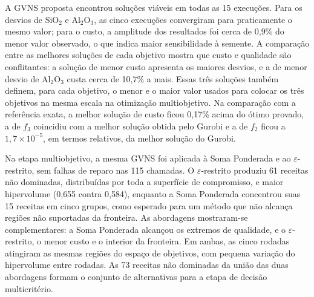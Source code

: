 \documentclass[conference]{IEEEtran}
\begin{document}
A GVNS proposta encontrou soluções viáveis em todas as 15 execuções. Para os desvios de SiO$_2$ e Al$_2$O$_3$, as cinco execuções convergiram para praticamente o mesmo valor; para o custo, a amplitude dos resultados foi cerca de 0{,}9\% do menor valor observado, o que indica maior sensibilidade à semente. A comparação entre as melhores soluções de cada objetivo mostra que custo e qualidade são conflitantes: a solução de menor custo apresenta os maiores desvios, e a de menor desvio de Al$_2$O$_3$ custa cerca de 10{,}7\% a mais. Essas três soluções também definem, para cada objetivo, o menor e o maior valor usados para colocar os três objetivos na mesma escala na otimização multiobjetivo. Na comparação com a referência exata, a melhor solução de custo ficou 0{,}17\% acima do ótimo provado, a de $f_3$ coincidiu com a melhor solução obtida pelo Gurobi e a de $f_2$ ficou a $1{,}7\times10^{-5}$, em termos relativos, da melhor solução do Gurobi.

Na etapa multiobjetivo, a mesma GVNS foi aplicada à Soma Ponderada e ao $\varepsilon$-restrito, sem falhas de reparo nas 115 chamadas. O $\varepsilon$-restrito produziu 61 receitas não dominadas, distribuídas por toda a superfície de compromisso, e maior hipervolume (0{,}655 contra 0{,}584), enquanto a Soma Ponderada concentrou suas 15 receitas em cinco grupos, como esperado para um método que não alcança regiões não suportadas da fronteira. As abordagens mostraram-se complementares: a Soma Ponderada alcançou os extremos de qualidade, e o $\varepsilon$-restrito, o menor custo e o interior da fronteira. Em ambas, as cinco rodadas atingiram as mesmas regiões do espaço de objetivos, com pequena variação do hipervolume entre rodadas. As 73 receitas não dominadas da união das duas abordagens formam o conjunto de alternativas para a etapa de decisão multicritério.
\end{document}
